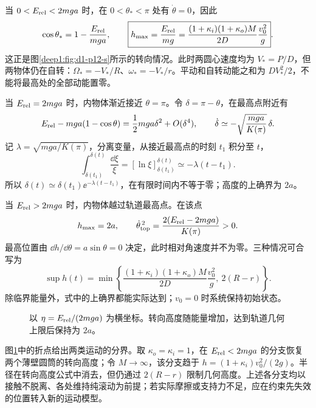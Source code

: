 \begin{solution}
当 $0<E_{\rm rel}<2mga$ 时，在 $0<\theta_*<\pi$ 处有 $\dot\theta=0$，因此
\[
\cos\theta_*=1-\frac{E_{\rm rel}}{mga},\qquad
\boxed{h_{\max}=\frac{E_{\rm rel}}{mg}
=\frac{(1+\kappa_i)(1+\kappa_o)M}{2D}\frac{v_0^2}{g}}.
\]
这正是图\ref{deep1:fig:d1-p12-s}所示的转向情况。此时两圆心速度均为 $V_*=P/D$，但两物体仍在自转：$\Omega_*=-V_*/R$、$\omega_*=-V_*/r$。平动和自转动能之和为 $DV_*^2/2$，不能将最高处的全部动能置零。

当 $E_{\rm rel}=2mga$ 时，内物体渐近接近 $\theta=\pi$。令 $\delta=\pi-\theta$，在最高点附近有
\[
E_{\rm rel}-mga(1-\cos\theta)
=\frac12mga\delta^2+O(\delta^4),\qquad
\dot\delta\simeq-\sqrt{\frac{mga}{K(\pi)}}\,\delta.
\]
记 $\lambda=\sqrt{mga/K(\pi)}$，分离变量，从接近最高点的时刻 $t_1$ 积分至 $t$，
\[
\int_{\delta(t_1)}^{\delta(t)}\frac{\dd\xi}{\xi}
=[\ln\xi]_{\delta(t_1)}^{\delta(t)}
\simeq-\lambda(t-t_1).
\]
所以 $\delta(t)\simeq\delta(t_1)\ee^{-\lambda(t-t_1)}$，在有限时间内不等于零；高度的上确界为 $2a$。

当 $E_{\rm rel}>2mga$ 时，内物体越过轨道最高点。在该点
\[
h_{\max}=2a,\qquad
\dot\theta_{\rm top}^{\,2}
=\frac{2(E_{\rm rel}-2mga)}{K(\pi)}>0.
\]
最高位置由 $\dd h/\dd\theta=a\sin\theta=0$ 决定，此时相对角速度并不为零。三种情况可合写为
\[
\boxed{\sup h(t)=\min\!\left\{
\frac{(1+\kappa_i)(1+\kappa_o)M}{2D}\frac{v_0^2}{g},\ 2(R-r)\right\}}.
\]
除临界能量外，式中的上确界都能实际达到；$v_0=0$ 时系统保持初始状态。

\begin{figure}[H]\centering
{}
\caption{以 $\eta=E_{\rm rel}/(2mga)$ 为横坐标。转向高度随能量增加，达到轨道几何上限后保持为 $2a$。}\label{deep1:fig:d1-p12-height}
\end{figure}

图\ref{deep1:fig:d1-p12-height}中的折点给出两类运动的分界。取 $\kappa_o=\kappa_i=1$，在 $E_{\rm rel}<2mga$ 的分支恢复两个薄壁圆筒的转向高度；令 $M\to\infty$，该分支趋于 $h=(1+\kappa_i)v_0^2/(2g)$。半径在转向高度公式中消去，但仍通过 $2(R-r)$ 限制几何高度。上述各分支均以接触不脱离、各处维持纯滚动为前提；若实际摩擦或支持力不足，应在约束先失效的位置转入新的运动模型。

\end{solution}

